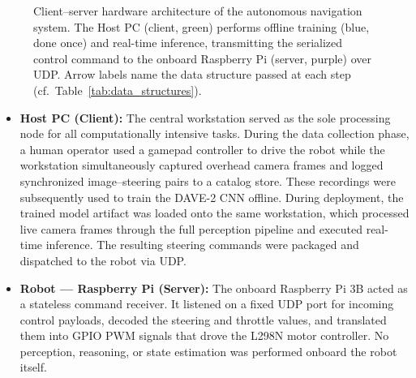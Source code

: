 \begin{figure}[H]
{%
    }
    \caption{Client--server hardware architecture of the autonomous navigation system. The Host PC (client, green) performs offline training (blue, done once) and real-time inference, transmitting the serialized control command to the onboard Raspberry Pi (server, purple) over UDP. Arrow labels name the data structure passed at each step (cf.\ Table~\ref{tab:data_structures}).}
    \label{fig:sys_arch}
\end{figure}

\begin{itemize}
    \item \textbf{Host PC (Client):} The central workstation served as the sole processing node for all computationally intensive tasks. During the data collection phase, a human operator used a gamepad controller to drive the robot while the workstation simultaneously captured overhead camera frames and logged synchronized image--steering pairs to a catalog store. These recordings were subsequently used to train the DAVE-2 CNN offline. During deployment, the trained model artifact was loaded onto the same workstation, which processed live camera frames through the full perception pipeline and executed real-time inference. The resulting steering commands were packaged and dispatched to the robot via UDP.

    \item \textbf{Robot --- Raspberry Pi (Server):} The onboard Raspberry Pi 3B acted as a stateless command receiver. It listened on a fixed UDP port for incoming control payloads, decoded the steering and throttle values, and translated them into GPIO PWM signals that drove the L298N motor controller. No perception, reasoning, or state estimation was performed onboard the robot itself.
\end{itemize}


